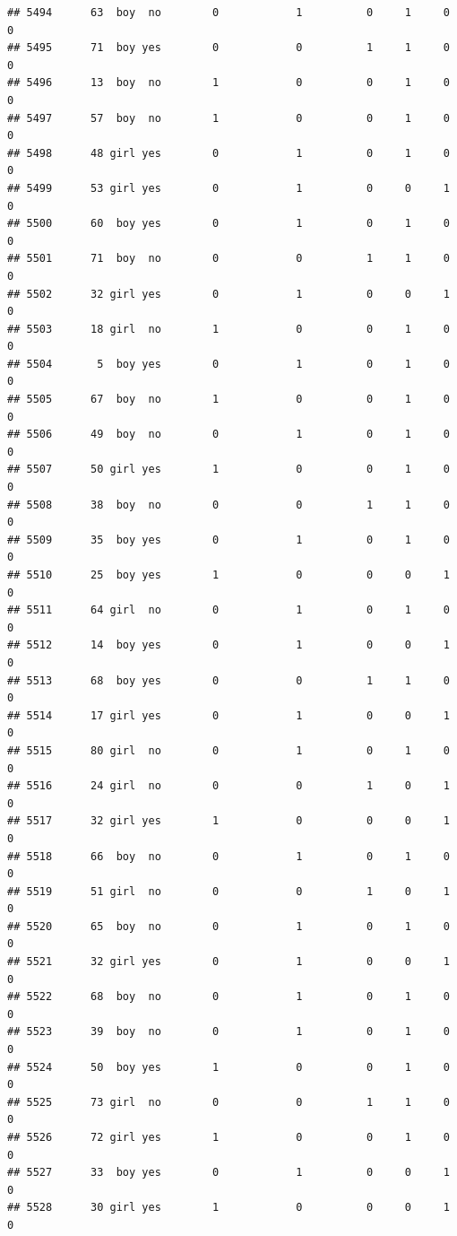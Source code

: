 \documentclass[man]{apa6}
\begin{document}
\begin{verbatim}
## 5494      63  boy  no        0            1          0     1     0     0
## 5495      71  boy yes        0            0          1     1     0     0
## 5496      13  boy  no        1            0          0     1     0     0
## 5497      57  boy  no        1            0          0     1     0     0
## 5498      48 girl yes        0            1          0     1     0     0
## 5499      53 girl yes        0            1          0     0     1     0
## 5500      60  boy yes        0            1          0     1     0     0
## 5501      71  boy  no        0            0          1     1     0     0
## 5502      32 girl yes        0            1          0     0     1     0
## 5503      18 girl  no        1            0          0     1     0     0
## 5504       5  boy yes        0            1          0     1     0     0
## 5505      67  boy  no        1            0          0     1     0     0
## 5506      49  boy  no        0            1          0     1     0     0
## 5507      50 girl yes        1            0          0     1     0     0
## 5508      38  boy  no        0            0          1     1     0     0
## 5509      35  boy yes        0            1          0     1     0     0
## 5510      25  boy yes        1            0          0     0     1     0
## 5511      64 girl  no        0            1          0     1     0     0
## 5512      14  boy yes        0            1          0     0     1     0
## 5513      68  boy yes        0            0          1     1     0     0
## 5514      17 girl yes        0            1          0     0     1     0
## 5515      80 girl  no        0            1          0     1     0     0
## 5516      24 girl  no        0            0          1     0     1     0
## 5517      32 girl yes        1            0          0     0     1     0
## 5518      66  boy  no        0            1          0     1     0     0
## 5519      51 girl  no        0            0          1     0     1     0
## 5520      65  boy  no        0            1          0     1     0     0
## 5521      32 girl yes        0            1          0     0     1     0
## 5522      68  boy  no        0            1          0     1     0     0
## 5523      39  boy  no        0            1          0     1     0     0
## 5524      50  boy yes        1            0          0     1     0     0
## 5525      73 girl  no        0            0          1     1     0     0
## 5526      72 girl yes        1            0          0     1     0     0
## 5527      33  boy yes        0            1          0     0     1     0
## 5528      30 girl yes        1            0          0     0     1     0

\end{verbatim}
\end{document}
